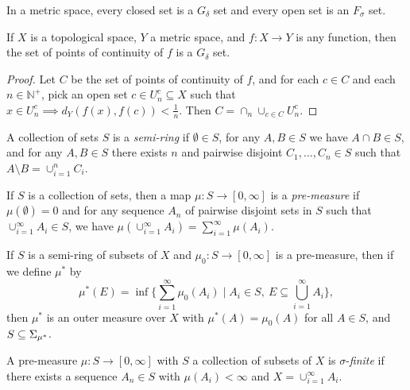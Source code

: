 \documentclass[letterpaper,11pt]{report}
\begin{document}
\begin{prop} In a metric space, every closed set is a $G_\delta$ set and every open set is an $F_\sigma$ set.
\end{prop}

\begin{prop} If $X$ is a topological space, $Y$ a metric space, and $f:X\rightarrow Y$ is any function, then the set of points of continuity of $f$ is a $G_\delta$ set.
\end{prop}
\begin{proof} Let $C$ be the set of points of continuity of $f$, and for each $c \in C$ and each $n \in \mathbb{N}^+$, pick an open set $c \in U_n^c \subseteq X$ such that $x \in U_n^c \implies d_Y(f(x),f(c)) < \frac{1}{n}$. Then $C = \cap_n \cup_{c\in C} U_n^c$.
\end{proof}

\begin{defn} A collection of sets $S$ is a \emph{semi-ring} if $\emptyset \in S$, for any $A,B \in S$ we have $A \cap B \in S$, and for any $A, B \in S$ there exists $n$ and pairwise disjoint $C_1, ..., C_n \in S$ such that $A \setminus B = \cup_{i=1}^n C_i$.
\end{defn}

\begin{defn} If $S$ is a collection of sets, then a map $\mu : S \rightarrow [0,\infty]$ is a \emph{pre-measure} if $\mu(\emptyset) = 0$ and for any sequence $A_n$ of pairwise disjoint sets in $S$ such that $\cup_{i=1}^\infty A_i \in S$, we have $\mu(\cup_{i=1}^\infty A_i) = \sum_{i=1}^\infty \mu(A_i)$.
\end{defn}

\begin{thm}\label{caratheodory-extension} If $S$ is a semi-ring of subsets of $X$ and $\mu_0 : S \rightarrow [0,\infty]$ is a pre-measure, then if we define $\mu^*$ by
\[
\mu^*(E) = \inf \Big\{\sum_{i=1}^\infty \mu_0(A_i) \mid A_i \in S,\ E \subseteq \bigcup_{i=1}^\infty A_i\Big\},
\]
then $\mu^*$ is an outer measure over $X$ with $\mu^*(A) = \mu_0(A)$ for all $A\in S$, and $S \subseteq \Sigma_{\mu^*}$.
\end{thm}

\begin{defn} A pre-measure $\mu : S \rightarrow [0,\infty]$ with $S$ a collection of subsets of $X$ is $\sigma$-\emph{finite} if there exists a sequence $A_n \in S$ with $\mu(A_i) < \infty$ and $X = \cup_{i=1}^\infty A_i$.
\end{defn}
\end{document}
